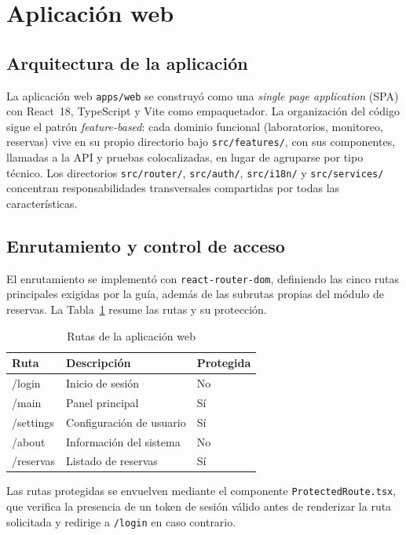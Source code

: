 \section{Aplicación web}
\label{sec:aplicacion-web}

\subsection{Arquitectura de la aplicación}

La aplicación web \texttt{apps/web} se construyó como una \emph{single
page application} (SPA) con React~18, TypeScript y Vite como
empaquetador. La organización del código sigue el patrón
\emph{feature-based}: cada dominio funcional (laboratorios, monitoreo,
reservas) vive en su propio directorio bajo \texttt{src/features/},
con sus componentes, llamadas a la API y pruebas colocalizadas, en
lugar de agruparse por tipo técnico. Los directorios
\texttt{src/router/}, \texttt{src/auth/}, \texttt{src/i18n/} y
\texttt{src/services/} concentran responsabilidades transversales
compartidas por todas las características.

\subsection{Enrutamiento y control de acceso}

El enrutamiento se implementó con \texttt{react-router-dom},
definiendo las cinco rutas principales exigidas por la guía, además de
las subrutas propias del módulo de reservas. La
Tabla~\ref{tab:rutas-web} resume las rutas y su protección.

\begin{table}[htbp]
\centering
\caption{Rutas de la aplicación web}
\label{tab:rutas-web}
\begin{tabular}{lll}
\toprule
Ruta & Descripción & Protegida \\
\midrule
/login & Inicio de sesión & No \\
/main & Panel principal & Sí \\
/settings & Configuración de usuario & Sí \\
/about & Información del sistema & No \\
/reservas & Listado de reservas & Sí \\
\bottomrule
\end{tabular}
\end{table}

Las rutas protegidas se envuelven mediante el componente
\texttt{ProtectedRoute.tsx}, que verifica la presencia de un token de
sesión válido antes de renderizar la ruta solicitada y redirige a
\texttt{/login} en caso contrario.

